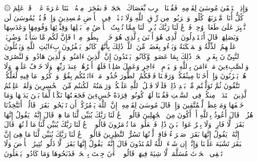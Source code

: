 \stopbuffer%
\startbuffer[\q:2:60]
۞ وَإِذِ ٱسۡتَسۡقَىٰ مُوسَىٰ لِقَوۡمِهِۦ فَقُلۡنَا ٱضۡرِب بِّعَصَاكَ ٱلۡحَجَرَۖ فَٱنفَجَرَتۡ مِنۡهُ ٱثۡنَتَا عَشۡرَةَ عَیۡنࣰاۖ قَدۡ عَلِمَ كُلُّ أُنَاسࣲ مَّشۡرَبَهُمۡۖ كُلُوا۟ وَٱشۡرَبُوا۟ مِن رِّزۡقِ ٱللَّهِ وَلَا تَعۡثَوۡا۟ فِی ٱلۡأَرۡضِ مُفۡسِدِینَ%
\stopbuffer%
\startbuffer[\q:2:61]
وَإِذۡ قُلۡتُمۡ یَٰمُوسَىٰ لَن نَّصۡبِرَ عَلَىٰ طَعَامࣲ وَٰحِدࣲ فَٱدۡعُ لَنَا رَبَّكَ یُخۡرِجۡ لَنَا مِمَّا تُنۢبِتُ ٱلۡأَرۡضُ مِنۢ بَقۡلِهَا وَقِثَّاۤئِهَا وَفُومِهَا وَعَدَسِهَا وَبَصَلِهَاۖ قَالَ أَتَسۡتَبۡدِلُونَ ٱلَّذِی هُوَ أَدۡنَىٰ بِٱلَّذِی هُوَ خَیۡرٌۚ ٱهۡبِطُوا۟ مِصۡرࣰا فَإِنَّ لَكُم مَّا سَأَلۡتُمۡۗ وَضُرِبَتۡ عَلَیۡهِمُ ٱلذِّلَّةُ وَٱلۡمَسۡكَنَةُ وَبَاۤءُو بِغَضَبࣲ مِّنَ ٱللَّهِۗ ذَٰلِكَ بِأَنَّهُمۡ كَانُوا۟ یَكۡفُرُونَ بِءَایَٰتِ ٱللَّهِ وَیَقۡتُلُونَ ٱلنَّبِیِّۦنَ بِغَیۡرِ ٱلۡحَقِّۗ ذَٰلِكَ بِمَا عَصَوا۟ وَّكَانُوا۟ یَعۡتَدُونَ%
\stopbuffer%
\startbuffer[\q:2:62]
إِنَّ ٱلَّذِینَ ءَامَنُوا۟ وَٱلَّذِینَ هَادُوا۟ وَٱلنَّصَٰرَىٰ وَٱلصَّٰبِءِینَ مَنۡ ءَامَنَ بِٱللَّهِ وَٱلۡیَوۡمِ ٱلۡءَاخِرِ وَعَمِلَ صَٰلِحࣰا فَلَهُمۡ أَجۡرُهُمۡ عِندَ رَبِّهِمۡ وَلَا خَوۡفٌ عَلَیۡهِمۡ وَلَا هُمۡ یَحۡزَنُونَ%
\stopbuffer%
\startbuffer[\q:2:63]
وَإِذۡ أَخَذۡنَا مِیثَٰقَكُمۡ وَرَفَعۡنَا فَوۡقَكُمُ ٱلطُّورَ خُذُوا۟ مَاۤ ءَاتَیۡنَٰكُم بِقُوَّةࣲ وَٱذۡكُرُوا۟ مَا فِیهِ لَعَلَّكُمۡ تَتَّقُونَ%
\stopbuffer%
\startbuffer[\q:2:64]
ثُمَّ تَوَلَّیۡتُم مِّنۢ بَعۡدِ ذَٰلِكَۖ فَلَوۡلَا فَضۡلُ ٱللَّهِ عَلَیۡكُمۡ وَرَحۡمَتُهُۥ لَكُنتُم مِّنَ ٱلۡخَٰسِرِینَ%
\stopbuffer%
\startbuffer[\q:2:65]
وَلَقَدۡ عَلِمۡتُمُ ٱلَّذِینَ ٱعۡتَدَوۡا۟ مِنكُمۡ فِی ٱلسَّبۡتِ فَقُلۡنَا لَهُمۡ كُونُوا۟ قِرَدَةً خَٰسِءِینَ%
\stopbuffer%
\startbuffer[\q:2:66]
فَجَعَلۡنَٰهَا نَكَٰلࣰا لِّمَا بَیۡنَ یَدَیۡهَا وَمَا خَلۡفَهَا وَمَوۡعِظَةࣰ لِّلۡمُتَّقِینَ%
\stopbuffer%
\startbuffer[\q:2:67]
وَإِذۡ قَالَ مُوسَىٰ لِقَوۡمِهِۦۤ إِنَّ ٱللَّهَ یَأۡمُرُكُمۡ أَن تَذۡبَحُوا۟ بَقَرَةࣰۖ قَالُوۤا۟ أَتَتَّخِذُنَا هُزُوࣰاۖ قَالَ أَعُوذُ بِٱللَّهِ أَنۡ أَكُونَ مِنَ ٱلۡجَٰهِلِینَ%
\stopbuffer%
\startbuffer[\q:2:68]
قَالُوا۟ ٱدۡعُ لَنَا رَبَّكَ یُبَیِّن لَّنَا مَا هِیَۚ قَالَ إِنَّهُۥ یَقُولُ إِنَّهَا بَقَرَةࣱ لَّا فَارِضࣱ وَلَا بِكۡرٌ عَوَانُۢ بَیۡنَ ذَٰلِكَۖ فَٱفۡعَلُوا۟ مَا تُؤۡمَرُونَ%
\stopbuffer%
\startbuffer[\q:2:69]
قَالُوا۟ ٱدۡعُ لَنَا رَبَّكَ یُبَیِّن لَّنَا مَا لَوۡنُهَاۚ قَالَ إِنَّهُۥ یَقُولُ إِنَّهَا بَقَرَةࣱ صَفۡرَاۤءُ فَاقِعࣱ لَّوۡنُهَا تَسُرُّ ٱلنَّٰظِرِینَ%
\stopbuffer%
\startbuffer[\q:2:70]
قَالُوا۟ ٱدۡعُ لَنَا رَبَّكَ یُبَیِّن لَّنَا مَا هِیَ إِنَّ ٱلۡبَقَرَ تَشَٰبَهَ عَلَیۡنَا وَإِنَّاۤ إِن شَاۤءَ ٱللَّهُ لَمُهۡتَدُونَ%
\stopbuffer%
\startbuffer[\q:2:71]
قَالَ إِنَّهُۥ یَقُولُ إِنَّهَا بَقَرَةࣱ لَّا ذَلُولࣱ تُثِیرُ ٱلۡأَرۡضَ وَلَا تَسۡقِی ٱلۡحَرۡثَ مُسَلَّمَةࣱ لَّا شِیَةَ فِیهَاۚ قَالُوا۟ ٱلۡءَٰنَ جِئۡتَ بِٱلۡحَقِّۚ فَذَبَحُوهَا وَمَا كَادُوا۟ یَفۡعَلُونَ%
